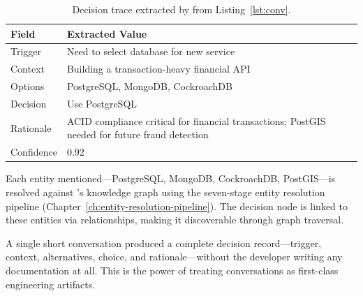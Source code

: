 \begin{table}[ht]
\centering
\caption{Decision trace extracted by \sysname{} from Listing~\ref{lst:conv}.}
\label{tab:extracted-trace}
\begin{tabularx}{\textwidth}{l X}
\toprule
\textbf{Field} & \textbf{Extracted Value} \\
\midrule
Trigger    & Need to select database for new service \\
Context    & Building a transaction-heavy financial API \\
Options    & PostgreSQL, MongoDB, CockroachDB \\
Decision   & Use PostgreSQL \\
Rationale  & ACID compliance critical for financial transactions;
             PostGIS needed for future fraud detection \\
Confidence & 0.92 \\
\bottomrule
\end{tabularx}
\end{table}

Each entity mentioned---PostgreSQL, MongoDB, CockroachDB, PostGIS---is resolved
against \sysname{}'s knowledge graph using the seven-stage entity resolution
pipeline (Chapter~\ref{ch:entity-resolution-pipeline}).  The decision node is
linked to these entities via  relationships, making it
discoverable through graph traversal.

\begin{keyinsight}
A single short conversation produced a complete decision record---trigger,
context, alternatives, choice, and rationale---without the developer writing
any documentation at all.  This is the power of treating conversations as
first-class engineering artifacts.
\end{keyinsight}
